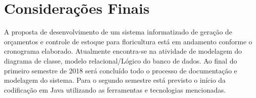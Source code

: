 \chapter{Considerações Finais}
A proposta de desenvolvimento de um sistema informatizado de geração de orçamentos e controle de estoque para floricultura está em andamento conforme o cronograma elaborado. 
Atualmente encontra-se na atividade de modelagem do diagrama de classe, modelo relacional/Lógico do banco de dados. 
Ao final do primeiro semestre de 2018 será concluído todo o processo de documentação e modelagem do sistema. Para o segundo semestre está previsto o início da codificação em Java utilizando as ferramentas e tecnologias mencionadas. 